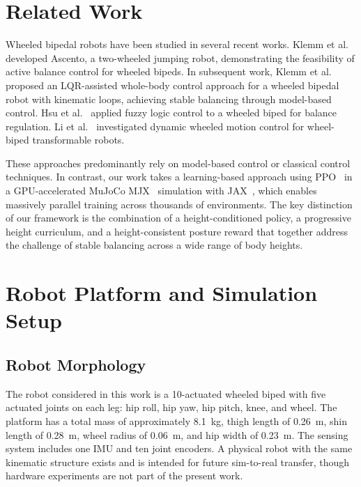 \documentclass[conference]{IEEEtran}
\begin{document}
\section{Related Work}
\label{sec:related}

Wheeled bipedal robots have been studied in several recent works. Klemm et al.~\cite{klemm2019ascento} developed Ascento, a two-wheeled jumping robot, demonstrating the feasibility of active balance control for wheeled bipeds. In subsequent work, Klemm et al.~\cite{klemm2020lqrwbc} proposed an LQR-assisted whole-body control approach for a wheeled bipedal robot with kinematic loops, achieving stable balancing through model-based control. Hsu et al.~\cite{hsu2022wbrfuzzy} applied fuzzy logic control to a wheeled biped for balance regulation. Li et al.~\cite{li2021wheelbiped} investigated dynamic wheeled motion control for wheel-biped transformable robots.

These approaches predominantly rely on model-based control or classical control techniques. In contrast, our work takes a learning-based approach using PPO~\cite{ppo} in a GPU-accelerated MuJoCo MJX~\cite{mujoco, mujoco_mjx_docs} simulation with JAX~\cite{jax}, which enables massively parallel training across thousands of environments. The key distinction of our framework is the combination of a height-conditioned policy, a progressive height curriculum, and a height-consistent posture reward that together address the challenge of stable balancing across a wide range of body heights.

\section{Robot Platform and Simulation Setup}

\subsection{Robot Morphology}
The robot considered in this work is a 10-actuated wheeled biped with five actuated joints on each leg: hip roll, hip yaw, hip pitch, knee, and wheel. The platform has a total mass of approximately \SI{8.1}{kg}, thigh length of \SI{0.26}{m}, shin length of \SI{0.28}{m}, wheel radius of \SI{0.06}{m}, and hip width of \SI{0.23}{m}. The sensing system includes one IMU and ten joint encoders. A physical robot with the same kinematic structure exists and is intended for future sim-to-real transfer, though hardware experiments are not part of the present work.
\end{document}

